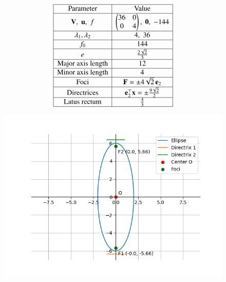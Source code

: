 \documentclass[journal]{article}
\begin{document}
\[
\begin{array}{|c|c|}
\hline
\text{Parameter} & \text{Value} \\
\hline
\mathbf{V},\;\mathbf{u},\;f & 
\begin{pmatrix}36 & 0\\0 & 4\end{pmatrix}, \; \mathbf{0}, \; -144 \\
\hline
\lambda_1,\lambda_2 & 4,\;36 \\
\hline
f_0 & 144 \\
\hline
e & \tfrac{2\sqrt{2}}{3} \\
\hline
\text{Major axis length} & 12 \\
\hline
\text{Minor axis length} & 4 \\
\hline
\text{Foci} & \mathbf{F}=\pm 4\sqrt{2}\,\mathbf{e}_2 \\
\hline
\text{Directrices} & \mathbf{e}_2^\top \mathbf{x} = \pm \tfrac{9\sqrt{2}}{2} \\
\hline
\text{Latus rectum} & \tfrac{4}{3} \\
\hline
\end{array}
\]
\newpage
\begin{figure}
    \centering
    \includegraphics[width=1.0\linewidth]{figs/Figure_1.png}
    \caption{}
    \label{fig:placeholder}
\end{figure}
\end{document}

